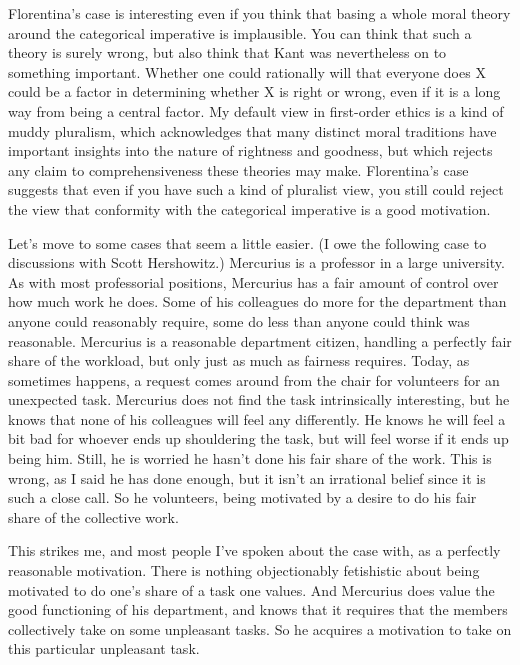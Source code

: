 \gls{Florentina}'s case is interesting even if you think that basing a whole moral theory around the categorical imperative is implausible. You can think that such a theory is surely wrong, but also think that Kant was nevertheless on to something important. Whether one could rationally will that everyone does X could be a factor in determining whether X is right or wrong, even if it is a long way from being a central factor. My default view in first-order ethics is a kind of muddy pluralism, which acknowledges that many distinct moral traditions have important insights into the nature of rightness and goodness, but which rejects any claim to comprehensiveness these theories may make. \gls{Florentina}'s case suggests that even if you have such a kind of pluralist view, you still could reject the view that conformity with the categorical imperative is a good motivation.

Let's move to some cases that seem a little easier. (I owe the following case to discussions with Scott Hershowitz.) \gls{Mercurius} is a professor in a large university. As with most professorial positions, \gls{Mercurius} has a fair amount of control over how much work he does. Some of his colleagues do more for the department than anyone could reasonably require, some do less than anyone could think was reasonable. \gls{Mercurius} is a reasonable department citizen, handling a perfectly fair share of the workload, but only just as much as fairness requires. Today, as sometimes happens, a request comes around from the chair for volunteers for an unexpected task. \gls{Mercurius} does not find the task intrinsically interesting, but he knows that none of his colleagues will feel any differently. He knows he will feel a bit bad for whoever ends up shouldering the task, but will feel worse if it ends up being him. Still, he is worried he hasn't done his fair share of the work. This is wrong, as I said he has done enough, but it isn't an irrational belief since it is such a close call. So he volunteers, being motivated by a desire to do his fair share of the collective work.

This strikes me, and most people I've spoken about the case with, as a perfectly reasonable motivation. There is nothing objectionably fetishistic about being motivated to do one's share of a task one values. And \gls{Mercurius} does value the good functioning of his department, and knows that it requires that the members collectively take on some unpleasant tasks. So he acquires a motivation to take on this particular unpleasant task.

